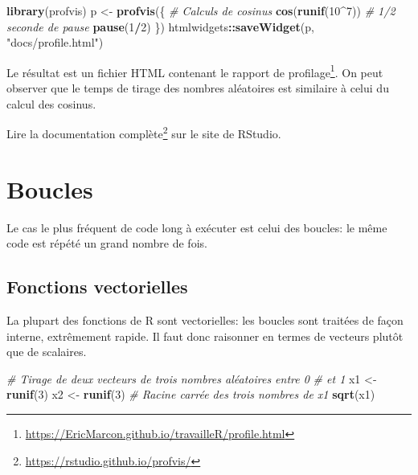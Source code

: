 \documentclass[
  12pt,
  french,
  a4paper,
  extrafontsizes,onecolumn,openright
  ]{memoir}
\newenvironment{Shaded}{\begin{snugshade}}{\end{snugshade}}
\newcommand{\CommentTok}[1]{\textcolor[rgb]{0.56,0.35,0.01}{\textit{#1}}}
\newcommand{\DecValTok}[1]{\textcolor[rgb]{0.00,0.00,0.81}{#1}}
\newcommand{\KeywordTok}[1]{\textcolor[rgb]{0.13,0.29,0.53}{\textbf{#1}}}
\newcommand{\NormalTok}[1]{#1}
\newcommand{\OperatorTok}[1]{\textcolor[rgb]{0.81,0.36,0.00}{\textbf{#1}}}
\newcommand{\StringTok}[1]{\textcolor[rgb]{0.31,0.60,0.02}{#1}}
\begin{document}
\scriptsize

\begin{Shaded}
\begin{Highlighting}[]
\KeywordTok{library}\NormalTok{(profvis)}
\NormalTok{p <-}\StringTok{ }\KeywordTok{profvis}\NormalTok{(\{}
    \CommentTok{# Calculs de cosinus}
    \KeywordTok{cos}\NormalTok{(}\KeywordTok{runif}\NormalTok{(}\DecValTok{10}\OperatorTok{^}\DecValTok{7}\NormalTok{))}
    \CommentTok{# 1/2 seconde de pause}
    \KeywordTok{pause}\NormalTok{(}\DecValTok{1}\OperatorTok{/}\DecValTok{2}\NormalTok{)}
\NormalTok{\})}
\NormalTok{htmlwidgets}\OperatorTok{::}\KeywordTok{saveWidget}\NormalTok{(p, }\StringTok{"docs/profile.html"}\NormalTok{)}
\end{Highlighting}
\end{Shaded}

\normalsize

Le résultat est un fichier HTML contenant le rapport de profilage\footnote{\url{https://EricMarcon.github.io/travailleR/profile.html}}.
On peut observer que le temps de tirage des nombres aléatoires est similaire à celui du calcul des cosinus.

Lire la documentation complète\footnote{\url{https://rstudio.github.io/profvis/}} sur le site de RStudio.

\hypertarget{boucles}{%
\section{Boucles}\label{boucles}}

Le cas le plus fréquent de code long à exécuter est celui des boucles: le même code est répété un grand nombre de fois.

\hypertarget{fonctions-vectorielles}{%
\subsection{Fonctions vectorielles}\label{fonctions-vectorielles}}

La plupart des fonctions de R sont vectorielles: les boucles sont traitées de façon interne, extrêmement rapide.
Il faut donc raisonner en termes de vecteurs plutôt que de scalaires.

\scriptsize

\begin{Shaded}
\begin{Highlighting}[]
\CommentTok{# Tirage de deux vecteurs de trois nombres aléatoires entre 0}
\CommentTok{# et 1}
\NormalTok{x1 <-}\StringTok{ }\KeywordTok{runif}\NormalTok{(}\DecValTok{3}\NormalTok{)}
\NormalTok{x2 <-}\StringTok{ }\KeywordTok{runif}\NormalTok{(}\DecValTok{3}\NormalTok{)}
\CommentTok{# Racine carrée des trois nombres de x1}
\KeywordTok{sqrt}\NormalTok{(x1)}
\end{Highlighting}
\end{Shaded}
\end{document}
